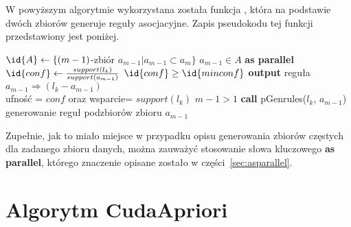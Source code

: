 W powyższym algorytmie wykorzystana została funkcja , która na podstawie dwóch zbiorów generuje reguły asocjacyjne. Zapis pseudokodu tej funkcji przedstawiony jest poniżej.

\begin{codebox}
		\li $\id{A} \gets \lbrace (m-1)$-zbiór $a_{m-1} | a_{m-1} \subset a_m \rbrace$
		\li \For $a_{m-1} \in A$ \textbf{as parallel}
			\li \Do
			$\id{conf} \gets \frac{support(l_k)}{support(a_{m-1})}$
			\li \If $\id{conf} \geq \id{minconf}$
				\li \Then
						\textbf{output} reguła $a_{m-1} \Rightarrow (l_k - a_{m-1})$ \\ ufność = $conf$ oraz wsparcie= $support(l_k)$
						\li \If $m-1 > 1$ 
							\li \Then
							\textbf{call} pGenrules($l_k$, $a_{m-1}$) \\ generowanie reguł podzbiorów zbioru $a_{m-1}$
						\End
				\End
			\End
		\End
\end{codebox}

Zupełnie, jak to miało miejsce w przypadku opisu generowania zbiorów częstych dla zadanego zbioru danych, można zauważyć stosowanie słowa kluczowego \textbf{as parallel}, którego znaczenie opisane zostało w części~\ref{sec:asparallel}.

\section{Algorytm CudaApriori\label{sec:capriori}}